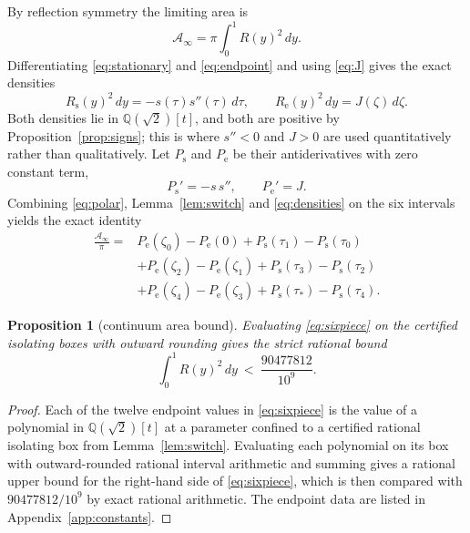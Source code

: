 \documentclass[11pt]{article}
\theoremstyle{plain}
\newtheorem{proposition}[theorem]{Proposition}
\theoremstyle{definition}
\theoremstyle{remark}
\newcommand{\Q}{\mathbb{Q}}
\newcommand{\Rsta}{R_{\mathrm{s}}}
\newcommand{\Rend}{R_{\mathrm{e}}}
\newcommand{\Ps}{P_{\mathrm{s}}}
\newcommand{\Pe}{P_{\mathrm{e}}}
\begin{document}
By reflection symmetry the limiting area is
\begin{equation}\label{eq:polar}
  \mathcal A_{\infty}=\pi\int_{0}^{1}R(y)^{2}\,dy .
\end{equation}
Differentiating \eqref{eq:stationary} and \eqref{eq:endpoint} and using
\eqref{eq:J} gives the exact densities
\begin{equation}\label{eq:densities}
  \Rsta(y)^{2}\,dy=-s(\tau)s''(\tau)\,d\tau,
  \qquad
  \Rend(y)^{2}\,dy=J(\zeta)\,d\zeta .
\end{equation}
Both densities lie in $\Q(\sqrt2)[t]$, and both are positive by
Proposition~\ref{prop:signs}; this is where $s''<0$ and $J>0$ are used
quantitatively rather than qualitatively. Let $\Ps$ and $\Pe$ be their
antiderivatives with zero constant term,
\[
  \Ps'=-s\,s'',\qquad \Pe'=J .
\]
Combining \eqref{eq:polar}, Lemma~\ref{lem:switch} and \eqref{eq:densities} on
the six intervals yields the exact identity
\begin{equation}\label{eq:sixpiece}
\begin{aligned}
  \frac{\mathcal A_{\infty}}{\pi}
  ={}&\Pe(\zeta_{0})-\Pe(0)
     +\Ps(\tau_{1})-\Ps(\tau_{0})\\
    &+\Pe(\zeta_{2})-\Pe(\zeta_{1})
     +\Ps(\tau_{3})-\Ps(\tau_{2})\\
    &+\Pe(\zeta_{4})-\Pe(\zeta_{3})
     +\Ps(\tau_{*})-\Ps(\tau_{4}).
\end{aligned}
\end{equation}

\begin{proposition}[continuum area bound]\label{prop:area}
Evaluating \eqref{eq:sixpiece} on the certified isolating boxes with outward
rounding gives the strict rational bound
\begin{equation}\label{eq:contbound}
  \int_{0}^{1}R(y)^{2}\,dy\ <\ \frac{90477812}{10^{9}} .
\end{equation}
\end{proposition}

\begin{proof}
Each of the twelve endpoint values in \eqref{eq:sixpiece} is the value of a
polynomial in $\Q(\sqrt2)[t]$ at a parameter confined to a certified rational
isolating box from Lemma~\ref{lem:switch}. Evaluating each polynomial on its box
with outward-rounded rational interval arithmetic and summing gives a rational
upper bound for the right-hand side of \eqref{eq:sixpiece}, which is then
compared with $90477812/10^{9}$ by exact rational arithmetic. The endpoint data
are listed in Appendix~\ref{app:constants}.
\end{proof}
\end{document}

